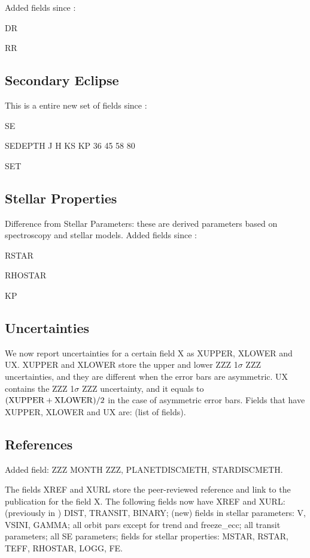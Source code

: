 \documentclass[11pt,preprint]{aastex}
\begin{document}
\begin{CJK*}{UTF8}{gbsn}
Added fields since \cite{Wright2011}:

DR

RR

\subsection{Secondary Eclipse}

This is a entire new set of fields since \cite{Wright2011}:

SE

SEDEPTH J H KS KP 36 45 58 80

SET

\subsection{Stellar Properties}

Difference from Stellar Parameters: these are derived parameters based
on spectroscopy and stellar models.
Added fields since \cite{Wright2011}:

RSTAR

RHOSTAR

KP

\subsection{Uncertainties}

We now report uncertainties for a certain field X as XUPPER, XLOWER
and UX. XUPPER and XLOWER store the upper and lower ZZZ 1$\sigma$ ZZZ
uncertainties, and they are different when the error bars are
asymmetric. UX contains the ZZZ 1$\sigma$ ZZZ uncertainty, and it
equals to $({\rm XUPPER+XLOWER})/2$ in the case of asymmetric error
bars. Fields that have XUPPER, XLOWER and UX are: (list of fields).

\subsection{References}

Added field: ZZZ MONTH ZZZ, PLANETDISCMETH, STARDISCMETH.

The fields XREF and XURL store the peer-reviewed reference and link to
the publication for the field X. The following fields now have XREF
and XURL: (previously in \citealt{Wright2011}) DIST, TRANSIT, BINARY;
(new) fields in stellar parameters: V, VSINI, GAMMA; all orbit pars except for
trend and freeze\_ecc; all transit parameters; all SE parameters;
fields for stellar properties: MSTAR, RSTAR, TEFF, RHOSTAR, LOGG, FE.


\end{CJK*}
\end{document}
